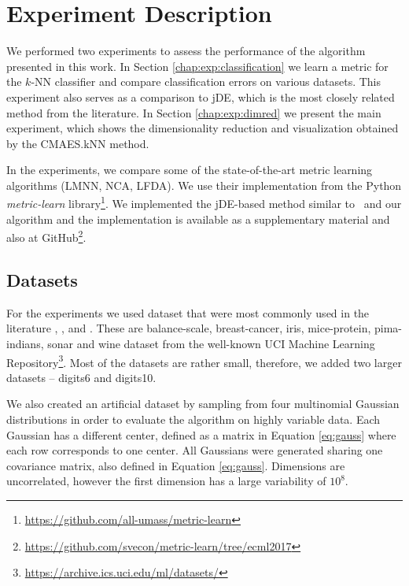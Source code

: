 \section{Experiment Description}

We performed two experiments to assess the performance of the algorithm presented in this work. In Section \ref{chap:exp:classification} we learn a metric for the $k$-NN classifier and compare classification errors on various datasets. This experiment also serves as a comparison to jDE, which is the most closely related method from the literature. In Section \ref{chap:exp:dimred} we present the main experiment, which shows the dimensionality reduction and visualization obtained by the CMAES.kNN method.

In the experiments, we compare some of the state-of-the-art metric learning algorithms (LMNN, NCA, LFDA). We use their implementation from the Python \textit{metric-learn} library\footnote{\url{https://github.com/all-umass/metric-learn}}. We implemented the jDE-based method similar to~\cite{fukui2013evolutionary} and our algorithm and the implementation is available as a supplementary material and also at GitHub\footnote{\url{https://github.com/svecon/metric-learn/tree/ecml2017}}.

\subsection{Datasets} \label{chap:exp:datasets}

For the experiments we used dataset that were most commonly used in the literature \cite{xing2002distance}, \cite{weinberger2009distance}, \cite{jacobgoldberger2004neighbourhood} and \cite{fukui2013evolutionary}. These are balance-scale, breast-cancer, iris, mice-protein, pima-indians, sonar and wine dataset from the well-known UCI Machine Learning Repository\footnote{\url{https://archive.ics.uci.edu/ml/datasets/}}. Most of the datasets are rather small, therefore, we added two larger datasets -- digits6 and digits10.

We also created an artificial dataset by sampling from four multinomial Gaussian distributions in order to evaluate the algorithm on highly variable data. Each Gaussian has a different center, defined as a matrix in Equation \eqref{eq:gauss} where each row corresponds to one center. All Gaussians were generated sharing one covariance matrix, also defined in Equation \ref{eq:gauss}. Dimensions are uncorrelated, however the first dimension has a large variability of $10^8$.

